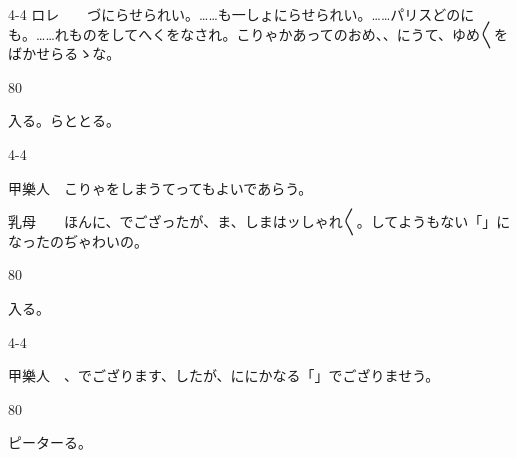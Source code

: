 \documentclass[tate,paper=b6j,jafontsize=9pt]{jlreq}
\begin{document}
\begin{azconvIndented}{4\zw}{-4\zw}
ロレ　　づにらせられい。……も一しょにらせられい。……パリスどのにも。……れものをしてへくをなされ。こりゃかあってのおめ、、にうて、ゆめ{〳〵}をばかせらるゝな。

\end{azconvIndented}
\begin{azconvIndented}{8\zw}{0\zw}

入る。らととる。

\end{azconvIndented}
\begin{azconvIndented}{4\zw}{-4\zw}

甲樂人　こりゃをしまうてってもよいであらう。

乳母　　ほんに、でござったが、ま、しまはッしゃれ{〳〵}。してようもない「」になったのぢゃわいの。

\end{azconvIndented}
\begin{azconvIndented}{8\zw}{0\zw}

入る。

\end{azconvIndented}
\begin{azconvIndented}{4\zw}{-4\zw}

甲樂人　、でござります、したが、ににかなる「」でござりませう。

\end{azconvIndented}
\begin{azconvIndented}{8\zw}{0\zw}

ピーターる。

\end{azconvIndented}
\end{document}
